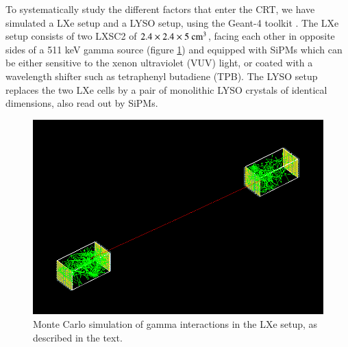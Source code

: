 \documentclass[review]{elsarticle}
\begin{document}
To systematically study the different factors that enter the CRT, we have simulated a LXe setup and a LYSO setup, using the Geant-4 toolkit \cite{Agostinelli:2002hh}. The LXe setup consists of two LXSC2 of 
$2.4 \times 2.4 \times 5 {\rm ~cm^3}$, facing each other in opposite sides of a 511 keV gamma source 
(figure \ref{fig.psetup}) and equipped with SiPMs which can be either sensitive to the xenon ultraviolet (VUV) light, or coated with a wavelength shifter such as tetraphenyl butadiene (TPB). The  LYSO setup replaces the two LXe cells by a pair of  monolithic LYSO crystals of identical dimensions, also read out by SiPMs.

 \begin{figure}[!bthp]
	\centering
	\includegraphics[scale=0.4]{../img/PetaloSetup.png}
	\caption{\label{fig.psetup} Monte Carlo simulation of gamma interactions in the LXe setup, as 
	described in the text.}
\end{figure}


%
\end{document}
